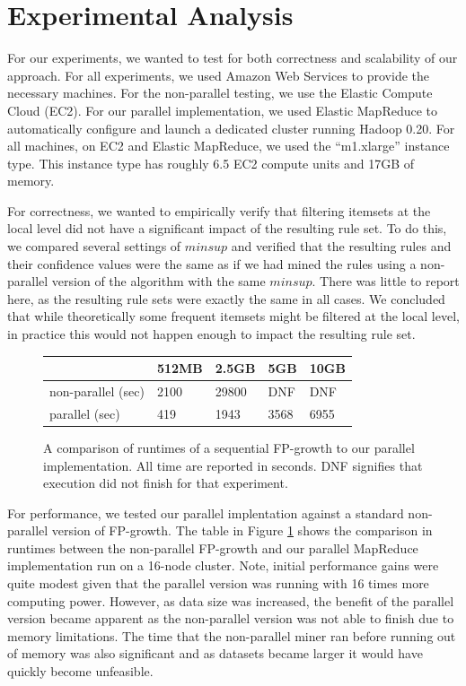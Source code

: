 \documentclass[11pt]{article}
\begin{document}
\section{Experimental Analysis}

For our experiments, we wanted to test for both correctness and
scalability of our approach. For all experiments, we used Amazon Web
Services to provide the necessary machines. For the non-parallel
testing, we use the Elastic Compute Cloud (EC2). For our parallel
implementation, we used Elastic MapReduce to automatically configure
and launch a dedicated cluster running Hadoop 0.20. For all machines,
on EC2 and Elastic MapReduce, we used the ``m1.xlarge'' instance
type. This instance type has roughly 6.5 EC2 compute units and 17GB of
memory. 

For correctness, we wanted to empirically verify that filtering
itemsets at the local level did not have a significant impact of the
resulting rule set. To do this, we compared several settings of
$minsup$ and verified that the resulting rules and their confidence
values were the same as if we had mined the rules using a non-parallel
version of the algorithm with the same $minsup$. There was little to
report here, as the resulting rule sets were exactly the same in all
cases. We concluded that while theoretically some frequent itemsets
might be filtered at the local level, in practice this would not
happen enough to impact the resulting rule set.

\begin{figure}
\centering
\begin{tabular}{| l | l | l | l | l |}
\hline
& 512MB & 2.5GB & 5GB & 10GB \\
\hline
non-parallel (sec) & 2100 & 29800 & DNF & DNF \\
\hline 
parallel (sec) & 419 & 1943 & 3568 & 6955 \\
\hline
\end{tabular}
\caption{A comparison of runtimes of a sequential FP-growth to our
  parallel implementation. All time are reported in seconds. DNF
  signifies that execution did not finish for that experiment.}
\label{fig:performance}
\end{figure}

For performance, we tested our parallel implentation against a
standard non-parallel version of FP-growth. The table in Figure
\ref{fig:performance} shows the comparison in runtimes between the
non-parallel FP-growth and our parallel MapReduce implementation run
on a 16-node cluster. Note, initial performance gains were quite
modest given that the parallel version was running with 16 times more
computing power. However, as data size was increased, the benefit of
the parallel version became apparent as the non-parallel version was
not able to finish due to memory limitations. The time that the
non-parallel miner ran before running out of memory was also
significant and as datasets became larger it would have quickly become
unfeasible.  
\end{document}
